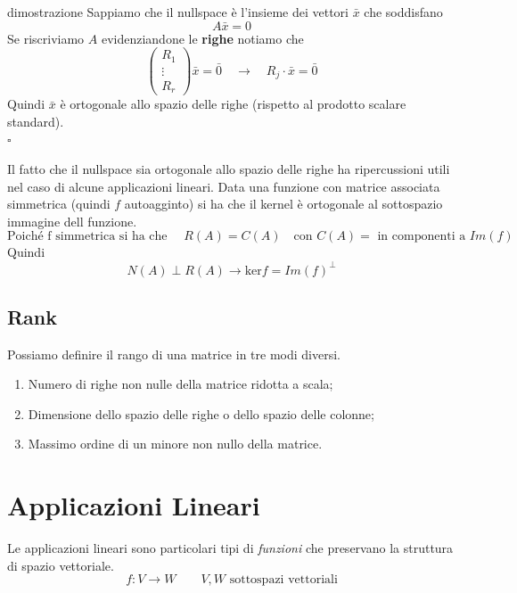 \documentclass[x11names]{article}
\newcommand*{\QEDB}{\null\nobreak\hfill\ensuremath{\square}}%
\begin{document}
\begin{es}{dimostrazione}
	Sappiamo che il nullspace è l'insieme dei vettori $\bar{x}$ che soddisfano
	\[
	A\bar{x} = 0
	\]
	Se riscriviamo $A$ evidenziandone le \textbf{righe} notiamo che
	\[
	\left(\begin{array}{c}
		R_{1} \\
		\vdots \\
		R_{r}
	\end{array}\right)\bar{x} = \bar{0}
	\quad \to \quad R_{j} \cdot \bar{x} = \bar{0} 
	\]
	Quindi $\bar{x}$ è ortogonale allo spazio delle righe (rispetto al prodotto scalare standard).
	\\
	\QEDB
\end{es}


\noindent
Il fatto che il nullspace sia ortogonale allo spazio delle righe ha ripercussioni utili nel caso di alcune applicazioni lineari. Data una funzione con matrice associata simmetrica (quindi $f$ autoagginto) si ha che il kernel è ortogonale al sottospazio immagine dell funzione.
\[
\text{Poiché f simmetrica si ha che } \quad R(A) = C(A) \quad \text{con } C(A) = \text{ in componenti a } Im(f) 
\]
Quindi
\[
N(A) \perp R(A) \to \text{ker}f = Im(f)^\perp
\]

\subsection{Rank}
Possiamo definire il rango di una matrice in tre modi diversi.
\begin{enumerate}
	\item Numero di righe non nulle della matrice ridotta a scala;
	\item Dimensione dello spazio delle righe o dello spazio delle colonne;
	\item Massimo ordine di un minore non nullo della matrice.
\end{enumerate}






\newpage
\section{Applicazioni Lineari}
Le applicazioni lineari sono particolari tipi di \textit{funzioni} che preservano la struttura di spazio vettoriale.
\[
f: V \longrightarrow W \qquad V,W \text{ sottospazi vettoriali}
\] 
\end{document}
